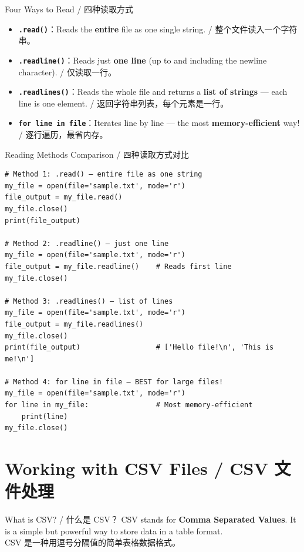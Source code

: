 \documentclass[11pt,a4paper]{report}
\let\oldtexttt\texttt
\renewcommand{\texttt}[1]{\textcolor{mainblue}{\oldtexttt{#1}}}
\begin{document}
\begin{concept}{Four Ways to Read / 四种读取方式}
    \begin{itemize}[itemsep=0.8em]
        \item \textbf{\texttt{.read()}}：Reads the \textbf{entire} file as one single string. / 整个文件读入一个字符串。
        \item \textbf{\texttt{.readline()}}：Reads just \textbf{one line} (up to and including the newline character). / 仅读取一行。
        \item \textbf{\texttt{.readlines()}}：Reads the whole file and returns a \textbf{list of strings} — each line is one element. / 返回字符串列表，每个元素是一行。
        \item \textbf{\texttt{for line in file}}：Iterates line by line — the most \textbf{memory-efficient} way! / 逐行遍历，最省内存。
    \end{itemize}
\end{concept}

\begin{examplebox}{Reading Methods Comparison / 四种读取方式对比}
\begin{lstlisting}
# Method 1: .read() — entire file as one string
my_file = open(file='sample.txt', mode='r')
file_output = my_file.read()
my_file.close()
print(file_output)

# Method 2: .readline() — just one line
my_file = open(file='sample.txt', mode='r')
file_output = my_file.readline()    # Reads first line
my_file.close()

# Method 3: .readlines() — list of lines
my_file = open(file='sample.txt', mode='r')
file_output = my_file.readlines()
my_file.close()
print(file_output)                  # ['Hello file!\n', 'This is me!\n']

# Method 4: for line in file — BEST for large files!
my_file = open(file='sample.txt', mode='r')
for line in my_file:                # Most memory-efficient
    print(line)
my_file.close()
\end{lstlisting}
\end{examplebox}

\section{Working with CSV Files / CSV 文件处理}

\begin{concept}{What is CSV? / 什么是 CSV？}
    CSV stands for \textbf{Comma Separated Values}. It is a simple but powerful way to store data in a table format. \\
    CSV 是一种用逗号分隔值的简单表格数据格式。
\end{concept}
\end{document}
